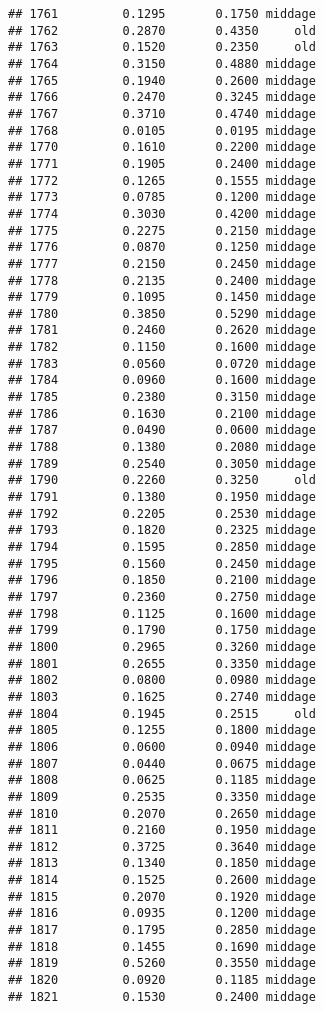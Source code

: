 \documentclass[
]{article}
\begin{document}
\begin{verbatim}
## 1761         0.1295       0.1750 middage
## 1762         0.2870       0.4350     old
## 1763         0.1520       0.2350     old
## 1764         0.3150       0.4880 middage
## 1765         0.1940       0.2600 middage
## 1766         0.2470       0.3245 middage
## 1767         0.3710       0.4740 middage
## 1768         0.0105       0.0195 middage
## 1770         0.1610       0.2200 middage
## 1771         0.1905       0.2400 middage
## 1772         0.1265       0.1555 middage
## 1773         0.0785       0.1200 middage
## 1774         0.3030       0.4200 middage
## 1775         0.2275       0.2150 middage
## 1776         0.0870       0.1250 middage
## 1777         0.2150       0.2450 middage
## 1778         0.2135       0.2400 middage
## 1779         0.1095       0.1450 middage
## 1780         0.3850       0.5290 middage
## 1781         0.2460       0.2620 middage
## 1782         0.1150       0.1600 middage
## 1783         0.0560       0.0720 middage
## 1784         0.0960       0.1600 middage
## 1785         0.2380       0.3150 middage
## 1786         0.1630       0.2100 middage
## 1787         0.0490       0.0600 middage
## 1788         0.1380       0.2080 middage
## 1789         0.2540       0.3050 middage
## 1790         0.2260       0.3250     old
## 1791         0.1380       0.1950 middage
## 1792         0.2205       0.2530 middage
## 1793         0.1820       0.2325 middage
## 1794         0.1595       0.2850 middage
## 1795         0.1560       0.2450 middage
## 1796         0.1850       0.2100 middage
## 1797         0.2360       0.2750 middage
## 1798         0.1125       0.1600 middage
## 1799         0.1790       0.1750 middage
## 1800         0.2965       0.3260 middage
## 1801         0.2655       0.3350 middage
## 1802         0.0800       0.0980 middage
## 1803         0.1625       0.2740 middage
## 1804         0.1945       0.2515     old
## 1805         0.1255       0.1800 middage
## 1806         0.0600       0.0940 middage
## 1807         0.0440       0.0675 middage
## 1808         0.0625       0.1185 middage
## 1809         0.2535       0.3350 middage
## 1810         0.2070       0.2650 middage
## 1811         0.2160       0.1950 middage
## 1812         0.3725       0.3640 middage
## 1813         0.1340       0.1850 middage
## 1814         0.1525       0.2600 middage
## 1815         0.2070       0.1920 middage
## 1816         0.0935       0.1200 middage
## 1817         0.1795       0.2850 middage
## 1818         0.1455       0.1690 middage
## 1819         0.5260       0.3550 middage
## 1820         0.0920       0.1185 middage
## 1821         0.1530       0.2400 middage

\end{verbatim}
\end{document}
